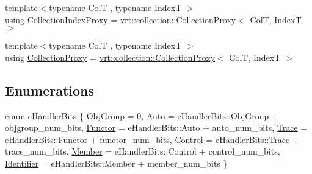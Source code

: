\begin{DoxyCompactItemize}
\item 
{\footnotesize template$<$typename ColT , typename IndexT $>$ }\\using \hyperlink{namespacevt_a2be17f5dafb626fe9f58d762b6aad2f0}{Collection\+Index\+Proxy} = \hyperlink{structvt_1_1vrt_1_1collection_1_1_collection_proxy}{vrt\+::collection\+::\+Collection\+Proxy}$<$ ColT, IndexT $>$
\item 
{\footnotesize template$<$typename ColT , typename IndexT $>$ }\\using \hyperlink{namespacevt_a0d58a693bfb96e0ce5d145692a1a1f98}{Collection\+Proxy} = \hyperlink{structvt_1_1vrt_1_1collection_1_1_collection_proxy}{vrt\+::collection\+::\+Collection\+Proxy}$<$ ColT, IndexT $>$
\end{DoxyCompactItemize}
\subsection*{Enumerations}
\begin{DoxyCompactItemize}
\item 
enum \hyperlink{namespacevt_af182285b57b225b163d5d8aff03cb8c2}{e\+Handler\+Bits} \{ \newline
\hyperlink{namespacevt_af182285b57b225b163d5d8aff03cb8c2ad0350d799a68d110696009c434e5b701}{Obj\+Group} = 0, 
\hyperlink{namespacevt_af182285b57b225b163d5d8aff03cb8c2abfa992da505171200949c7e580e84ea2}{Auto} = e\+Handler\+Bits\+:\+:Obj\+Group + objgroup\+\_\+num\+\_\+bits, 
\hyperlink{namespacevt_af182285b57b225b163d5d8aff03cb8c2ac61e9f48e514369f0eb8ac5cebf9fb14}{Functor} = e\+Handler\+Bits\+:\+:Auto + auto\+\_\+num\+\_\+bits, 
\hyperlink{namespacevt_af182285b57b225b163d5d8aff03cb8c2aee391b103987f3eb488e081ecc1fc5e8}{Trace} = e\+Handler\+Bits\+:\+:Functor + functor\+\_\+num\+\_\+bits, 
\newline
\hyperlink{namespacevt_af182285b57b225b163d5d8aff03cb8c2a3e3fe7a58187c2288f3c2177be08d4d5}{Control} = e\+Handler\+Bits\+:\+:Trace + trace\+\_\+num\+\_\+bits, 
\hyperlink{namespacevt_af182285b57b225b163d5d8aff03cb8c2a4e2cf24ac4752089ddca27fb7e8a43f8}{Member} = e\+Handler\+Bits\+:\+:Control + control\+\_\+num\+\_\+bits, 
\hyperlink{namespacevt_af182285b57b225b163d5d8aff03cb8c2a4f58efa47c6cfd117a011be7820d1d8a}{Identifier} = e\+Handler\+Bits\+:\+:Member + member\+\_\+num\+\_\+bits
 \}
\end{DoxyCompactItemize}
